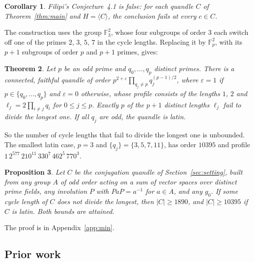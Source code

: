 \documentclass[11pt]{article}
\newtheorem{theorem}{Theorem}[section]
\newtheorem{proposition}[theorem]{Proposition}
\newtheorem{corollary}[theorem]{Corollary}
\newcommand{\F}{\mathbb{F}}
\begin{document}
\begin{corollary}\label{cor:filipi}
Filipi's Conjecture~4.1 is false: for each quandle $C$ of
Theorem~\ref{thm:main} and $H=\langle C\rangle$, the conclusion fails at
every $c\in C$.
\end{corollary}

The construction uses the group $\F_3^2$, whose four subgroups of order
$3$ each switch off one of the primes $2$, $3$, $5$, $7$ in the cycle
lengths. Replacing it by $\F_p^2$, with its $p+1$ subgroups of order $p$
and $p+1$ primes, gives:

\begin{theorem}\label{thm:family}
Let $p$ be an odd prime and $q_0,\dots,q_p$ distinct primes. There is a
connected, faithful quandle of order $p^{2+\varepsilon}\prod_{q_j\ne p}
q_j^{(p-1)/2}$, where $\varepsilon=1$ if $p\in\{q_0,\dots,q_p\}$ and
$\varepsilon=0$ otherwise, whose profile consists of the lengths $1$, $2$
and $\ell_j=2\prod_{i\ne j}q_i$ for $0\le j\le p$. Exactly $p$ of the $p+1$
distinct lengths $\ell_j$ fail to divide the longest one. If all $q_j$
are odd, the quandle is latin.
\end{theorem}

So the number of cycle lengths that fail to divide the longest one is
unbounded. The smallest latin case, $p=3$ and $\{q_j\}=\{3,5,7,11\}$, has
order $10395$ and profile $1\,2^{577}\,210^{11}\,330^{7}\,462^{5}\,770^{3}$.

\begin{proposition}\label{prop:min}
Let $C$ be the conjugation quandle of Section~\ref{sec:setting}, built
from any group $A$ of odd order acting on a sum of vector spaces over
distinct prime fields, any involution $P$ with $PaP=a^{-1}$ for $a\in A$,
and any $g_0$. If some cycle length of $C$ does not divide the longest,
then $|C|\ge1890$, and $|C|\ge10395$ if $C$ is latin. Both bounds are
attained.
\end{proposition}

The proof is in Appendix~\ref{app:min}.

\subsection{Prior work}
\end{document}

